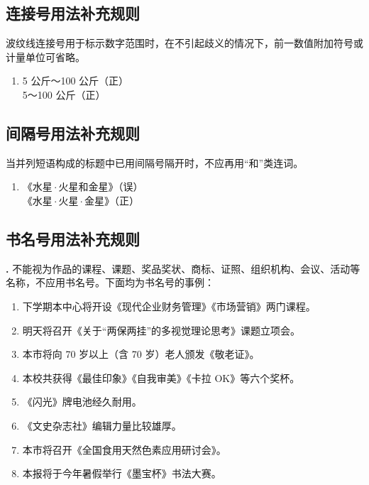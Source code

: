 \documentclass[a4paper]{article}
\newcounter{hercounter}[subsubsection]
\renewcommand{\thehercounter}{\textbf{\thesubsection.\arabic{hercounter}}}
\begin{document}
\subsection{连接号用法补充规则}

波纹线连接号用于标示数字范围时，在不引起歧义的情况下，前一数值附加符号或计量单位可省略。

\begin{enumerate}[label=\textbf{示例：},labelsep=0pt,left=2em, align=left,topsep=1pt,parsep=1pt]
    \item 5 公斤～100 公斤（正）\\5～100 公斤（正）
\end{enumerate}

\subsection{间隔号用法补充规则}

当并列短语构成的标题中已用间隔号隔开时，不应再用“和”类连词。

\begin{enumerate}[label=\textbf{示例：},labelsep=0pt,left=2em, align=left,topsep=1pt,parsep=1pt]
    \item 《水星\,$\cdot$\,火星和金星》（误）\\《水星\,$\cdot$\,火星\,$\cdot$\,金星》（正）
\end{enumerate}

\subsection{书名号用法补充规则}

\thehercounter\hspace{1em}
不能视为作品的课程、课题、奖品奖状、商标、证照、组织机构、会议、活动等名称，不应用书名号。下面均为书名号的事例：

\begin{enumerate}
    \item 下学期本中心将开设《现代企业财务管理》《市场营销》两门课程。
    \item 明天将召开《关于“两保两挂”的多视觉理论思考》课题立项会。
    \item 本市将向 70 岁以上（含 70 岁）老人颁发《敬老证》。
    \item 本校共获得《最佳印象》《自我审美》《卡拉 OK》等六个奖杯。
    \item 《闪光》牌电池经久耐用。
    \item 《文史杂志社》编辑力量比较雄厚。
    \item 本市将召开《全国食用天然色素应用研讨会》。
    \item 本报将于今年暑假举行《墨宝杯》书法大赛。
\end{enumerate}
\end{document}
